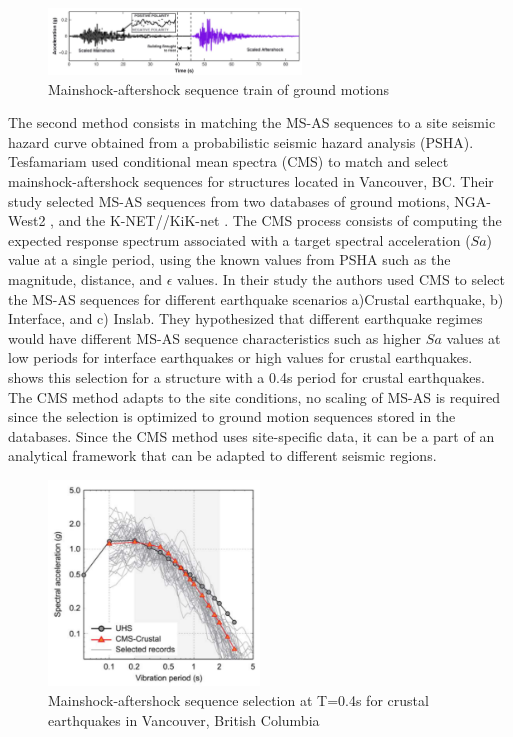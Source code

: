 \begin{figure}[htbp]
\centering
\includegraphics[width=0.6\textwidth]{Chapter-2/figs/MS-AS_sequence_Luco}
\caption{Mainshock-aftershock sequence train of ground motions \cite{Raghunandan2015}}
\label{fig:MS-AS_Luco}
\end{figure}

The second method consists in matching the MS-AS sequences to a site seismic hazard curve obtained from a probabilistic seismic hazard analysis (PSHA). Tesfamariam \cite{Tesfamariam2015} used conditional mean spectra (CMS) to match and select mainshock-aftershock sequences for structures located in Vancouver, BC. Their study selected MS-AS sequences from two databases of ground motions, NGA-West2 \citep{Ancheta2014}, and the K-NET//KiK-net \cite{NIEDK-NETKiK-net2019}. The CMS process consists of computing the expected response spectrum associated with a target spectral acceleration ($Sa$) value at a single period, using the known values from PSHA such as the magnitude, distance, and $\epsilon$ values. In their study the authors used CMS to select the MS-AS sequences for different earthquake scenarios a)Crustal earthquake, b) Interface, and c) Inslab. They hypothesized that different earthquake regimes would have different MS-AS sequence characteristics such as higher $Sa$ values at low periods for interface earthquakes or high values for crustal earthquakes.  shows this selection for a structure with a 0.4s period for crustal earthquakes. The CMS method adapts to the site conditions, no scaling of MS-AS is required since the selection is optimized to ground motion sequences stored in the databases. Since the CMS method uses site-specific data, it can be a part of an analytical framework that can be adapted to different seismic regions.

\begin{figure}[htbp]
\centering
\includegraphics[width=0.5\textwidth]{Chapter-2/figs/CMS-Tesfamariam_MS-AS_seq}
\caption{Mainshock-aftershock sequence selection at T=0.4s for crustal earthquakes in Vancouver, British Columbia \cite{Tesfamariam2015}}
\label{fig:MS-AS_Goda}
\end{figure}

